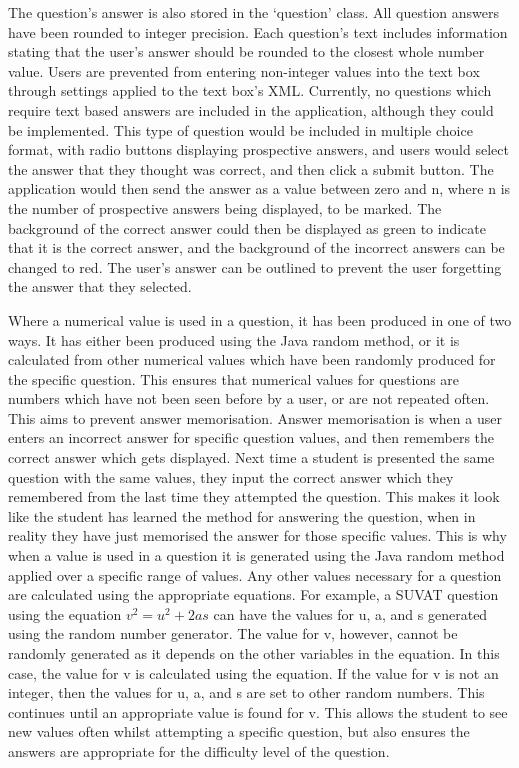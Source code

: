 \documentclass{article}
\begin{document}
The question's answer is also stored in the `question' class. All question answers have been rounded to integer precision. Each question's text includes information stating that the user's answer should be rounded to the closest whole number value. Users are prevented from entering non-integer values into the text box through settings applied to the text box's XML. Currently, no questions which require text based answers are included in the application, although they could be implemented. This type of question would be included in multiple choice format, with radio buttons displaying prospective answers, and users would select the answer that they thought was correct, and then click a submit button. The application would then send the answer as a value between zero and n, where n is the number of prospective answers being displayed, to be marked. The background of the correct answer could then be displayed as green to indicate that it is the correct answer, and the background of the incorrect answers can be changed to red. The user's answer can be outlined to prevent the user forgetting the answer that they selected. \par

Where a numerical value is used in a question, it has been produced in one of two ways. It has either been produced using the Java random method, or it is calculated from other numerical values which have been randomly produced for the specific question. This ensures that numerical values for questions are numbers which have not been seen before by a user, or are not repeated often. This aims to prevent answer memorisation. Answer memorisation is when a user enters an incorrect answer for specific question values, and then remembers the correct answer which gets displayed. Next time a student is presented the same question with the same values, they input the correct answer which they remembered from the last time they attempted the question. This makes it look like the student has learned the method for answering the question, when in reality they have just memorised the answer for those specific values. This is why when a value is used in a question it is generated using the Java random method applied over a specific range of values. Any other values necessary for a question are calculated using the appropriate equations. For example, a SUVAT question using the equation \(v^2 = u^2 + 2as\) can have the values for u, a, and s generated using the random number generator. The value for v, however, cannot be randomly generated as it depends on the other variables in the equation. In this case, the value for v is calculated using the equation. If the value for v is not an integer, then the values for u, a, and s are set to other random numbers. This continues until an appropriate value is found for v. This allows the student to see new values often whilst attempting a specific question, but also ensures the answers are appropriate for the difficulty level of the question. \par
\end{document}
